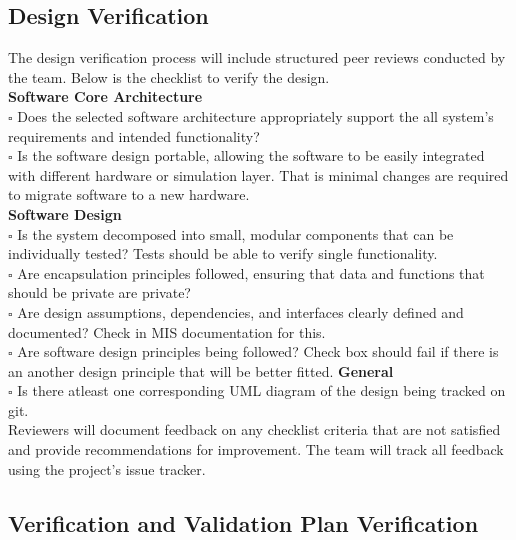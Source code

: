 \documentclass[12pt, titlepage]{article}
\begin{document}
\subsection{Design Verification}\label{sec:design_verification}

The design verification process will include structured peer reviews conducted
by the team. Below is the checklist to verify the design.\\
\newline
\textbf{Software Core Architecture} \\
$\square$ Does the selected software architecture appropriately support the all
system's requirements and intended functionality? \\
$\square$ Is the software design portable, allowing the software to be easily
integrated with different hardware or simulation layer. That is minimal changes
are required to migrate software to a new hardware. \\
\newline
\newline
\textbf{Software Design} \\
$\square$ Is the system decomposed into small, modular components that can be
individually tested? Tests should be able to verify single functionality. \\
$\square$ Are encapsulation principles followed, ensuring that data and
functions that should be private are private? \\
$\square$ Are design assumptions, dependencies, and interfaces clearly defined
and documented? Check in MIS documentation \cite{MIS} for this. \\
$\square$ Are software design principles being followed? Check box should fail
if there is an another design principle that will be better fitted.
\newline
\newline
\textbf{General} \\
$\square$ Is there atleast one corresponding UML diagram of the design being
tracked on git. \\

Reviewers will document feedback on any checklist criteria that are not
satisfied and provide recommendations for improvement. The team will track all
feedback using the project's issue tracker.

\subsection{Verification and Validation Plan Verification}
\label{sec:vnv_plan_verification}
\end{document}
